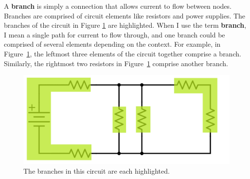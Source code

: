 \par
A \textbf{branch} is simply a connection that allows current to flow between nodes. Branches are comprised of circuit elements like resistors and power supplies. The branches of the circuit in Figure \ref{branchesHighlighted} are highlighted. When I use the term \textbf{branch}, I mean a single path for current to flow through, and one branch could be comprised of several elements depending on the context. For example, in Figure~\ref{branchesHighlighted}, the leftmost three elements of the circuit together comprise a branch. Similarly, the rightmost two resistors in Figure~\ref{branchesHighlighted} comprise another branch.
\begin{figure}[h!]
\centering
\includegraphics[width=13cm]{figures/branchesHighlighted.png}
\caption{The branches in this circuit are each highlighted.}
\label{branchesHighlighted}
\end{figure}

